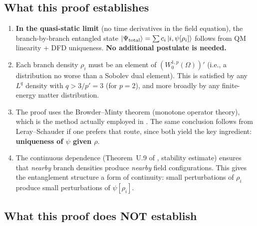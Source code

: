 \documentclass[aps,prd,twocolumn,superscriptaddress,nofootinbib]{revtex4-2}
\begin{document}
\subsection{What this proof establishes}

\begin{enumerate}
\item \textbf{In the quasi-static limit} (no time derivatives in the
field equation), the branch-by-branch entangled state
$\ket{\Psi_{\mathrm{total}}} = \sum c_i \ket{i, \psi[\rho_i]}$ follows
from QM linearity + DFD uniqueness. \textbf{No additional postulate
is needed.}

\item Each branch density $\rho_i$ must be an element of
$(W_0^{1,p}(\Omega))'$ (i.e., a distribution no worse than a Sobolev
dual element). This is satisfied by any $L^q$ density with
$q > 3/p' = 3$ (for $p = 2$), and more broadly by any finite-energy
matter distribution.

\item The proof uses the Browder--Minty theorem (monotone operator theory),
which is the method actually employed in \cite{DFDUnified}. The same
conclusion follows from Leray--Schauder if one prefers that route, since
both yield the key ingredient: \textbf{uniqueness of $\psi$ given $\rho$}.

\item The continuous dependence (Theorem~U.9 of \cite{DFDUnified},
stability estimate) ensures that \emph{nearby} branch densities produce
\emph{nearby} field configurations. This gives the entanglement structure
a form of continuity: small perturbations of $\rho_i$ produce small
perturbations of $\psi[\rho_i]$.
\end{enumerate}

\subsection{What this proof does NOT establish}
\end{document}
